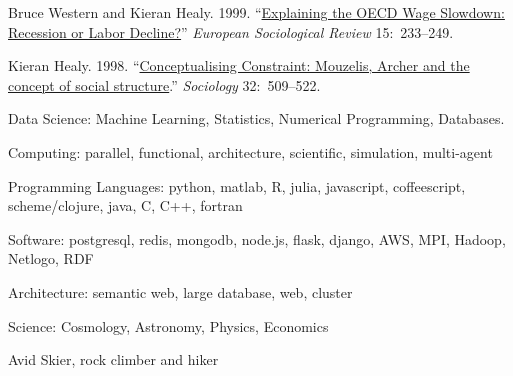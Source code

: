 \documentclass[11pt]{article}
\begin{document}
\ind Bruce Western and Kieran Healy. 1999. ``\href{http://www.kieranhealy.org/files/papers/western-healy99.pdf}{Explaining the OECD Wage Slowdown:
Recession or Labor Decline?}''  \emph{European Sociological Review}
15:~233--249.


\ind  Kieran Healy. 1998.  ``\href{http://www.kieranhealy.org/files/papers/constraint98.pdf}{Conceptualising Constraint: Mouzelis, Archer and the concept of
  social structure}.'' \emph{Sociology} 32:~509--522. 


\bigskip


\medskip

\ind Data Science: Machine Learning, Statistics, Numerical Programming, Databases.

\ind Computing: parallel, functional, architecture, scientific, simulation, multi-agent

\ind Programming Languages: python, matlab, R, julia, javascript, coffeescript, scheme/clojure, java, C, C++, fortran

\ind Software: postgresql, redis, mongodb, node.js, flask, django, AWS, MPI, Hadoop, Netlogo, RDF

\ind Architecture: semantic web, large database, web, cluster

\ind Science: Cosmology, Astronomy, Physics, Economics


\bigskip
{}
\medskip

\medskip

\ind Avid Skier, rock climber and hiker
\end{document}

